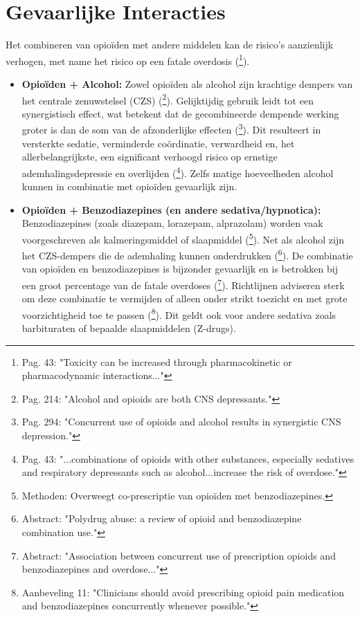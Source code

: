 \documentclass[11pt, a4paper]{report} %
\begin{document}
\section{Gevaarlijke Interacties}
\label{sec:interacties}
Het combineren van opioïden met andere middelen kan de risico's aanzienlijk verhogen, met name het risico op een fatale overdosis (\cite{Compton2021Polysubstance}\footnote{Pag. 43: "Toxicity can be increased through pharmacokinetic or pharmacodynamic interactions..."}).
\begin{itemize}
    \item \textbf{Opioïden + Alcohol:} Zowel opioïden als alcohol zijn krachtige dempers van het centrale zenuwstelsel (CZS) (\cite{JACC2020CardioComplications}\footnote{Pag. 214: "Alcohol and opioids are both CNS depressants."}). Gelijktijdig gebruik leidt tot een synergistisch effect, wat betekent dat de gecombineerde dempende werking groter is dan de som van de afzonderlijke effecten (\cite{Gupta2010ChemistryOpioids}\footnote{Pag. 294: "Concurrent use of opioids and alcohol results in synergistic CNS depression."}). Dit resulteert in versterkte sedatie, verminderde coördinatie, verwardheid en, het allerbelangrijkste, een significant verhoogd risico op ernstige ademhalingsdepressie en overlijden (\cite{Compton2021Polysubstance}\footnote{Pag. 43: "...combinations of opioids with other substances, especially sedatives and respiratory depressants such as alcohol...increase the risk of overdose."}). Zelfs matige hoeveelheden alcohol kunnen in combinatie met opioïden gevaarlijk zijn.
    \item \textbf{Opioïden + Benzodiazepines (en andere sedativa/hypnotica):} Benzodiazepines (zoals diazepam, lorazepam, alprazolam) worden vaak voorgeschreven als kalmeringsmiddel of slaapmiddel (\cite{Rudolph2024AssocPainMgmtOUDMedicaid}\footnote{Methoden: Overweegt co-prescriptie van opioïden met benzodiazepines.}). Net als alcohol zijn het CZS-dempers die de ademhaling kunnen onderdrukken (\cite{Jones2012PolydrugAbuseOpioidBenzo}\footnote{Abstract: "Polydrug abuse: a review of opioid and benzodiazepine combination use."}). De combinatie van opioïden en benzodiazepines is bijzonder gevaarlijk en is betrokken bij een groot percentage van de fatale overdoses (\cite{Sun2017ConcurrentOpioidsBenzosOverdose}\footnote{Abstract: "Association between concurrent use of prescription opioids and benzodiazepines and overdose..."}). Richtlijnen adviseren sterk om deze combinatie te vermijden of alleen onder strikt toezicht en met grote voorzichtigheid toe te passen (\cite{Dowell2016CDCGuideline}\footnote{Aanbeveling 11: "Clinicians should avoid prescribing opioid pain medication and benzodiazepines concurrently whenever possible."}). Dit geldt ook voor andere sedativa zoals barbituraten of bepaalde slaapmiddelen (Z-drugs).

\end{itemize}
\end{document}
